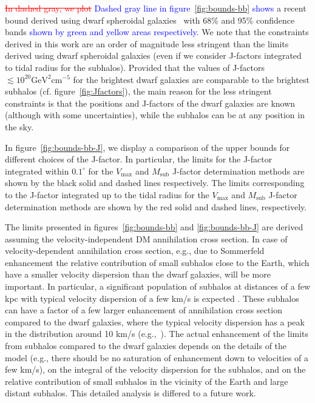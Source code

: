 \documentclass[12pt, a4paper]{article}
\newcommand{\new}[1]{\textcolor{blue}{#1}}
\newcommand{\old}[1]{\textcolor{red}{\st{#1}}}
\begin{document}
\old{In dashed gray, we plot}
\new{Dashed gray line in figure~\ref{fig:bounds-bb} shows} a recent bound derived using dwarf spheroidal galaxies~\cite{2024PhRvD.109f3024M} with 68\% and 95\% confidence bands \new{shown by green and yellow areas respectively.}
We note that the constraints derived in this work are an order of magnitude less stringent than the limits derived using dwarf spheroidal galaxies (even if we consider J-factors integrated to tidal radius for the subhalos).
Provided that the values of J-factors $\lesssim 10^{20} \mathrm{GeV^2 cm^{-5}} $ for the brightest dwarf galaxies \citep{2024PhRvD.109f3024M} are comparable to the brightest subhalos (cf. figure~\ref{fig:Jfactors}), the main reason for the less stringent constraints is that the positions and J-factors of the dwarf galaxies are known (although with some uncertainties), while the subhalos can be at any position in the sky.

In figure~\ref{fig:bounds-bb-J}, we display a comparison of the upper bounds for different choices of the J-factor.
In particular, the limits for the J-factor integrated within $0.1^\circ$ for the $V_\textrm{max}$ and $M_\textrm{sub}$ J-factor
determination methods are shown by the black solid and dashed lines respectively. 
The limits corresponding to the J-factor integrated up to the tidal radius for 
the $V_\textrm{max}$ and $M_\textrm{sub}$ J-factor determination methods are shown by the red solid and dashed lines, respectively.



The limits presented in figures~\ref{fig:bounds-bb} and \ref{fig:bounds-bb-J} are derived assuming the velocity-independent DM annihilation cross section.
In case of velocity-dependent annihilation cross section, e.g., due to Sommerfeld enhancement \cite{ArkaniHamed:2008qn,Piccirillo:2022qet,Lacroix:2022cjm,Facchinetti:2022jtd}
the relative contribution of small subhalos close to the Earth, which have a smaller velocity dispersion than the dwarf galaxies, will be more important.
In particular, a significant population of subhalos at distances of a few kpc with typical velocity dispersion of a few km/s is expected \cite{2024MNRAS.530.2496A}.
These subhalos can have a factor of a few larger enhancement of annihilation cross section compared to the dwarf galaxies, where the typical velocity dispersion has a peak in the distribution around 10 km/s (e.g.,~\cite{2018JCAP...04..035L}).
The actual enhancement of the limits from subhalos compared to the dwarf galaxies depends on the details of the model (e.g., there should be no saturation of enhancement down to velocities of a few km/s), on the integral of the velocity dispersion for the subhalos, and on the relative contribution of small subhalos in the vicinity of the Earth and large distant subhalos.
This detailed analysis is differed to a future work.
\end{document}
